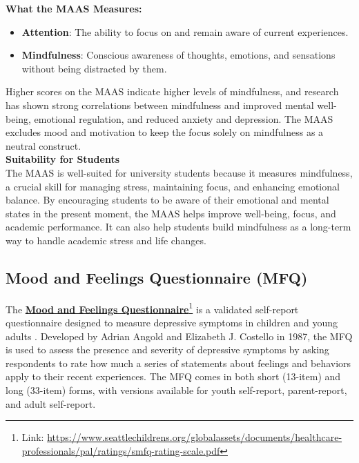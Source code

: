 \noindent 
\textbf{What the MAAS Measures:} 
\begin{itemize} 
    \item \textbf{Attention}: The ability to focus on and remain aware of current experiences. 
    \item \textbf{Mindfulness}: Conscious awareness of thoughts, emotions, and sensations without being distracted by them. 
\end{itemize}
Higher scores on the MAAS indicate higher levels of mindfulness, and research has shown strong correlations between mindfulness and improved mental well-being, emotional regulation, and reduced anxiety and depression. The MAAS excludes mood and motivation to keep the focus solely on mindfulness as a neutral construct.\vspace{5mm} \\
\noindent \textbf{Suitability for Students} \\
The MAAS is well-suited for university students because it measures mindfulness, a crucial skill for managing stress, maintaining focus, and enhancing emotional balance. By encouraging students to be aware of their emotional and mental states in the present moment, the MAAS helps improve well-being, focus, and academic performance. It can also help students build mindfulness as a long-term way to handle academic stress and life changes.

\subsection{Mood and Feelings Questionnaire (MFQ)}

The \textbf{\href{https://www.seattlechildrens.org/globalassets/documents/healthcare-professionals/pal/ratings/smfq-rating-scale.pdf}{Mood and Feelings Questionnaire}}\footnote{Link: \url{https://www.seattlechildrens.org/globalassets/documents/healthcare-professionals/pal/ratings/smfq-rating-scale.pdf}} is a validated self-report questionnaire designed to measure depressive symptoms in children and young adults \cite{mfq-review}. Developed by Adrian Angold and Elizabeth J. Costello in 1987, the MFQ is used to assess the presence and severity of depressive symptoms by asking respondents to rate how much a series of statements about feelings and behaviors apply to their recent experiences. The MFQ comes in both short (13-item) and long (33-item) forms, with versions available for youth self-report, parent-report, and adult self-report.\vspace{5mm}

